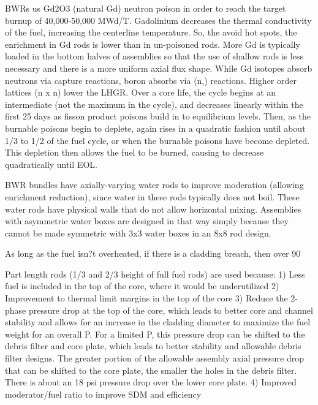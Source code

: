 \documentclass[10pt]{article}
\begin{document}
BWRs us Gd2O3 (natural Gd) neutron poison in order to reach the target burnup of 40,000-50,000 MWd/T. Gadolinium decreases the thermal conductivity of the fuel, increasing the centerline temperature. So, the avoid hot spots, the enrichment in Gd rods is lower than in un-poisoned rods. More Gd is typically loaded in the bottom halves of assemblies so that the use of shallow rods is less necessary and there is a more uniform axial flux shape. While Gd isotopes absorb neutrons via capture reactions, boron absorbs via (n,) reactions. Higher order lattices (n x n) lower the LHGR. Over a core life, the cycle begins at an intermediate  (not the maximum in the cycle), and decreases linearly within the first 25 days as fisson product poisons build in to equilibrium levels. Then, as the burnable poisons begin to deplete,  again rises in a quadratic fashion until about 1/3 to 1/2 of the fuel cycle, or when the burnable poisons have become depleted. This depletion then allows the fuel to be burned, causing  to decrease quadratically until EOL.  

BWR bundles have axially-varying water rods to improve moderation (allowing enrichment reduction), since water in these rods typically does not boil. These water rods have physical walls that do not allow horizontal mixing. Assemblies with asymmetric water boxes are designed in that way simply because they cannot be made symmetric with 3x3 water boxes in an 8x8 rod design. 

As long as the fuel isn?t overheated, if there is a cladding breach, then over 90%

Part length rods (1/3 and 2/3 height of full fuel rods) are used because:
1)	Less fuel is included in the top of the core, where it would be underutilized
2)	Improvement to thermal limit margins in the top of the core
3)	Reduce the 2-phase pressure drop at the top of the core, which leads to better core and channel stability and allows for an increase in the cladding diameter to maximize the fuel weight for an overall P. For a limited P, this pressure drop can be shifted to the debris filter and core plate, which leads to better stability and allowable debris filter designs. The greater portion of the allowable assembly axial pressure drop that can be shifted to the core plate, the smaller the holes in the debris filter. There is about an 18 psi pressure drop over the lower core plate. 
4)	Improved moderator/fuel ratio to improve SDM and efficiency
\end{document}

